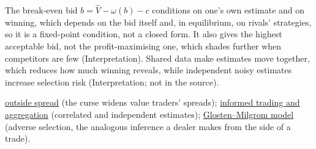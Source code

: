 \begin{qfdefinition}
 The break-even bid $b=\widehat V-\omega(b)-c$ conditions on one's own estimate and on winning, which depends on the bid itself and, in equilibrium, on rivals' strategies, so it is a fixed-point condition, not a closed form. It also gives the highest acceptable bid, not the profit-maximising one, which shades further when competitors are few (Interpretation). Shared data make estimates move together, which reduces how much winning reveals, while independent noisy estimates increase selection risk (Interpretation; not in the source).

 \hyperref[def:outside-spread]{outside spread} (the curse widens value traders' spreads); \hyperref[res:informed-trading-aggregation]{informed trading and aggregation} (correlated and independent estimates); \hyperref[mod:glosten-milgrom]{Glosten--Milgrom model} (adverse selection, the analogous inference a dealer makes from the side of a trade).

\end{qfdefinition}

